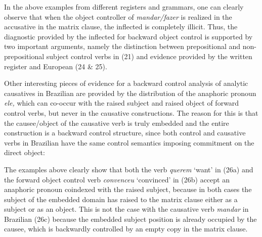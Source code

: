 \documentclass[output=paper]{langsci/langscibook}
\begin{document}
In the above examples from different registers and grammars, one can clearly observe that when the object controller of \textit{mandar\slash fazer}\textbf{ }is realized in the accusative in the matrix clause, the inflected  is completely illicit. Thus, the diagnostic provided by the inflected  for backward object control is supported by two important arguments, namely the distinction between prepositional and non{}-prepositional subject control verbs in (21) and evidence provided by the written register and European  (24 \& 25).

Other interesting pieces of evidence for a backward control analysis of analytic causatives in Brazilian  are provided by the distribution of the anaphoric pronoun \textit{ele,} which can co-occur with the raised subject and raised object of forward control verbs, but never in the causative constructions. The reason for this is that the causee\slash object of the causative verb is truly embedded and the entire construction is a backward control structure, since both control and causative verbs in Brazilian  have the same control semantics imposing commitment on the direct object:

\ea%
    \label{ex:moreno:26}
    \z
\z
    
The examples above clearly show that both the  verb \textit{querem} ‘want’ in (26a) and the forward object control verb \textit{convenceu} ‘convinced’ in (26b) accept an anaphoric pronoun coindexed with the raised subject, because in both cases the subject of the embedded domain has raised to the matrix clause either as a subject or as an object. This is not the case with the causative verb \textit{mandar} in Brazilian  (26c) because the embedded subject position is already occupied by the causee, which is backwardly controlled by an empty copy in the matrix clause. 
\end{document}
